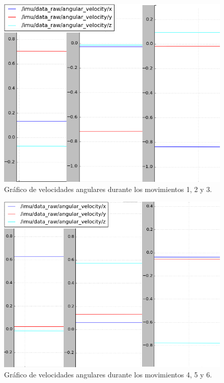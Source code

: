 \begin{figure}[ht]
    \centering
    \includegraphics[scale=0.42]{./Figures/angular_velocity_1.png}
    \caption{Gráfico de velocidades angulares durante los movimientos 1, 2 y 3.}
    \label{fig:velocidadAngular1}
\end{figure}

\begin{figure}[ht]
    \centering
    \includegraphics[scale=0.42]{./Figures/angular_velocity_2.png}
    \caption{Gráfico de velocidades angulares durante los movimientos 4, 5 y 6.}
    \label{fig:velocidadAngular2}
\end{figure}


